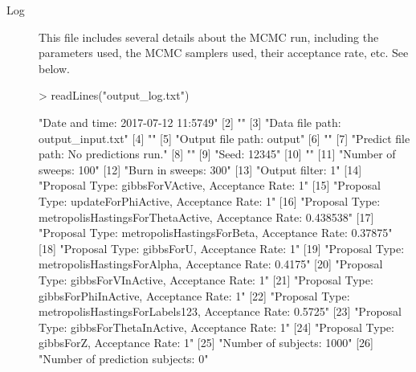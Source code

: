 \documentclass{article}
\begin{document}
\begin{description}
\item[Log] This file includes several details about the MCMC run, including the parameters used, the MCMC samplers used, their acceptance rate, etc. See below. 

\begin{Schunk}
\begin{Sinput}
> readLines("output_log.txt")
\end{Sinput}
\begin{Soutput}
 [1] "Date and time: 2017-07-12 11:5749"                                         
 [2] ""                                                                          
 [3] "Data file path: output_input.txt"                                          
 [4] ""                                                                          
 [5] "Output file path: output"                                                  
 [6] ""                                                                          
 [7] "Predict file path: No predictions run."                                    
 [8] ""                                                                          
 [9] "Seed: 12345"                                                               
[10] ""                                                                          
[11] "Number of sweeps: 100"                                                     
[12] "Burn in sweeps: 300"                                                       
[13] "Output filter: 1"                                                          
[14] "Proposal Type: gibbsForVActive, Acceptance Rate: 1"                        
[15] "Proposal Type: updateForPhiActive, Acceptance Rate: 1"                     
[16] "Proposal Type: metropolisHastingsForThetaActive, Acceptance Rate: 0.438538"
[17] "Proposal Type: metropolisHastingsForBeta, Acceptance Rate: 0.37875"        
[18] "Proposal Type: gibbsForU, Acceptance Rate: 1"                              
[19] "Proposal Type: metropolisHastingsForAlpha, Acceptance Rate: 0.4175"        
[20] "Proposal Type: gibbsForVInActive, Acceptance Rate: 1"                      
[21] "Proposal Type: gibbsForPhiInActive, Acceptance Rate: 1"                    
[22] "Proposal Type: metropolisHastingsForLabels123, Acceptance Rate: 0.5725"    
[23] "Proposal Type: gibbsForThetaInActive, Acceptance Rate: 1"                  
[24] "Proposal Type: gibbsForZ, Acceptance Rate: 1"                              
[25] "Number of subjects: 1000"                                                  
[26] "Number of prediction subjects: 0"                                          

\end{Soutput}
\end{Schunk}
\end{description}
\end{document}
